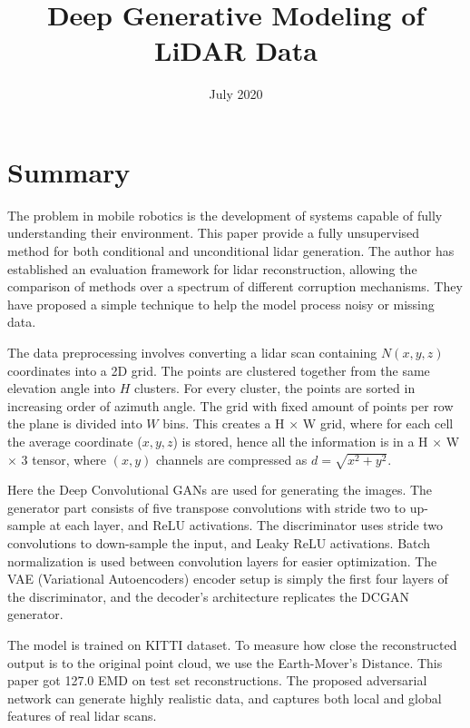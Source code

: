 \documentclass{article}
\title{Deep Generative Modeling of LiDAR Data}
\date{July 2020}
\begin{document}
\maketitle

\section*{Summary}

\hspace{6mm} The problem in mobile robotics is the development of systems capable of fully understanding their environment. This paper provide a fully unsupervised method for both conditional and unconditional lidar generation. The author has established an evaluation framework for lidar reconstruction, allowing the comparison of methods over a spectrum of different corruption mechanisms. They have proposed a simple technique to help the model process noisy or missing data.

\vspace{5mm}

The data preprocessing involves converting a lidar scan containing $N (x,y,z)$ coordinates into a 2D grid. The points are clustered together from the same elevation angle into $H$ clusters. For every cluster, the points are sorted in increasing order of azimuth angle. The grid with fixed amount of points per row the plane is divided into $W$ bins. This creates a H $\times$ W grid, where for each cell the average coordinate ($x,y,z$) is stored, hence all the information is in a H $\times$ W $\times$ 3 tensor, where $(x, y)$ channels are compressed as $d = \sqrt{x^2 + y^2}$.

\vspace{5mm}

Here the Deep Convolutional GANs are used for generating the images. The generator part consists of five transpose convolutions with stride two to up-sample at each layer, and ReLU activations. The discriminator uses
stride two convolutions to down-sample the input, and Leaky ReLU activations. Batch normalization is used between convolution layers for easier optimization. The VAE (Variational Autoencoders) encoder setup is simply the first four layers of the discriminator, and the decoder’s architecture replicates the DCGAN generator.

\vspace{5mm}

The model is trained on KITTI dataset. To measure how close the reconstructed output is to the original point cloud, we use the Earth-Mover’s Distance. This paper got 127.0 EMD on test set reconstructions. The proposed adversarial network can generate highly realistic data, and captures both local and global features of real lidar scans.
\end{document}
